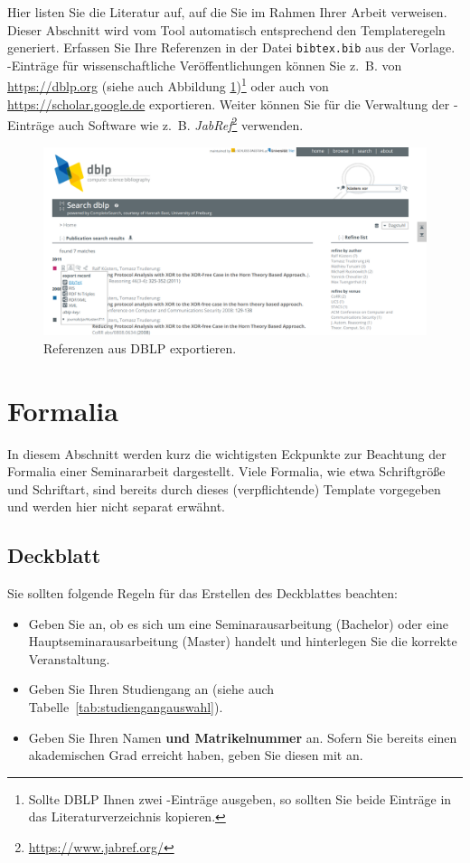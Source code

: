 \documentclass[lang=english]{secseminar}
\begin{document}
Hier listen Sie die Literatur auf, auf die Sie im Rahmen Ihrer Arbeit verweisen. Dieser Abschnitt
wird vom Tool  automatisch entsprechend den Templateregeln generiert. Erfassen Sie
Ihre Referenzen in der Datei \texttt{bibtex.bib} aus der Vorlage. -Einträge für
wissenschaftliche Veröffentlichungen können Sie z.~B. von \url{https://dblp.org} (siehe auch
Abbildung \ref{abb:dblp})\footnote{Sollte DBLP Ihnen zwei -Einträge ausgeben, so
  sollten Sie beide Einträge in das Literaturverzeichnis kopieren.} oder auch von
\url{https://scholar.google.de} exportieren. Weiter können Sie für die Verwaltung der
-Einträge auch Software wie z.~B.
\emph{JabRef}\footnote{\url{https://www.jabref.org/}} verwenden.

\begin{figure}
    \centering
    \includegraphics[width=\textwidth]{dblp.png}
    \caption{ Referenzen aus DBLP exportieren.}
    \label{abb:dblp}
\end{figure}


\section{Formalia}
In diesem Abschnitt werden kurz die wichtigsten Eckpunkte zur Beachtung der Formalia einer
Seminararbeit dargestellt. Viele Formalia, wie etwa Schriftgröße und Schriftart, sind bereits durch
dieses (verpflichtende) Template vorgegeben und werden hier nicht separat erwähnt.


\subsection{Deckblatt}
Sie sollten folgende Regeln für das Erstellen des Deckblattes beachten:
\begin{itemize}
\item Geben Sie an, ob es sich um eine Seminarausarbeitung (Bachelor) oder eine
  Hauptseminarausarbeitung (Master) handelt und hinterlegen Sie die korrekte Veranstaltung.
\item Geben Sie Ihren Studiengang an (siehe auch Tabelle~\ref{tab:studiengangauswahl}).
\item Geben Sie Ihren Namen \textbf{und Matrikelnummer} an. Sofern Sie bereits einen akademischen
  Grad erreicht haben, geben Sie diesen mit an.
\end{itemize}
\end{document}
